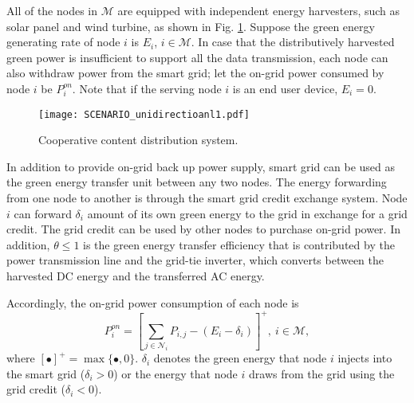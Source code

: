 \documentclass[journal,12pt,onecolumn]{IEEEtran}
\begin{document}
All of the nodes in $\mathcal{M}$ are equipped with independent energy harvesters, such as solar panel and wind turbine, as shown in Fig. \ref{harvesting}. Suppose the green energy generating rate of node $i$ is $E_i$, $i\in\mathcal{M}$. In case that the distributively harvested green power is insufficient to support all the data transmission, each node can also withdraw power from the smart grid; let the on-grid power consumed by node $i$ be $P_i^{on}$. Note that if the serving node $i$ is an end user device, $E_i=0$.
\begin{figure}[t]
\centering
\texttt{[image: SCENARIO\_unidirectioanl1.pdf]}\caption{Cooperative content distribution system.}
\label{harvesting}
\vspace{-1em}
\end{figure}

In addition to provide on-grid back up power supply, smart grid can be used as the green energy transfer unit between any two nodes. The energy forwarding from one node to another is through the smart grid credit exchange system. Node $i$ can forward $\delta_i$ amount of its own green energy to the grid in exchange for a grid credit. The grid credit can be used by other nodes to purchase on-grid power. In addition, $\theta\le 1$ is the green energy transfer efficiency that is contributed by the power transmission line and the grid-tie inverter, which converts between the harvested DC energy and the transferred AC energy.

Accordingly, the on-grid power consumption of each node is 
\begin{equation}\label{on_grid_PW}
P_i^{on}=\left[\sum\limits_{j \in\mathcal{N}_i} {{P_{i,j}}} - (E_i-\delta_i)\right]^+,\: i\in\mathcal{M},
\end{equation}
where $[\bullet]^+=\max\{\bullet,0\}$. $\delta_i$ denotes the green energy that node $i$ injects into the smart grid ($\delta_i>0$) or the energy that node $i$ draws from the grid using the grid credit ($\delta_i<0$). 
\end{document}

